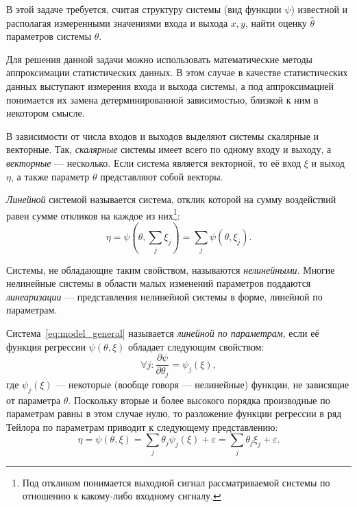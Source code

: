 В этой задаче требуется,
считая структуру системы (вид функции \( \psi \)) известной и располагая
измеренными значениями входа и выхода \( x, y \),
найти оценку \( \hat{\theta} \) параметров системы \( \theta \).

Для решения данной задачи можно использовать математические методы аппроксимации статистических данных.
В этом случае в качестве статистических данных выступают измерения входа и выхода системы,
а под аппроксимацией понимается их замена детерминированной зависимостью,
близкой к ним в некотором смысле. %

В зависимости от числа входов и выходов выделяют системы скалярные и векторные.
Так, \emph{скалярные} системы имеет всего по одному входу и выходу, а \emph{векторные} --- несколько.
Если система является векторной, то её вход \( \xi \) и выход \( \eta \),
а также параметр \( \theta \) представляют собой векторы.

\emph{Линейной} системой называется система,
отклик которой на сумму воздействий равен сумме откликов на каждое из них\footnote{%
  Под откликом понимается выходной сигнал рассматриваемой системы по отношению к
  какому-либо входному сигналу.}:
\begin{equation*}
  \eta = \psi(\theta, \sum_j \xi_j) = \sum_j \psi(\theta, \xi_j).
\end{equation*}

Системы, не обладающие таким свойством, называются \emph{нелинейными}.
Многие нелинейные системы в области малых изменений параметров поддаются
\emph{линеаризации} --- представления нелинейной системы в форме, линейной по параметрам.

Система~\eqref{eq:model_general} называется \emph{линейной по параметрам},
если её функция регрессии \( \psi(\theta, \xi) \) обладает следующим свойством:
\begin{equation*}
  \forall j: \dfrac{\partial \psi}{\partial \theta_j} = \psi_j(\xi),
\end{equation*}
где \( \psi_j(\xi) \) --- некоторые (вообще говоря --- нелинейные) функции,
не зависящие от параметра \( \theta \).
Поскольку вторые и более высокого порядка производные по параметрам равны в этом случае нулю,
то разложение функции регрессии в ряд Тейлора по параметрам приводит к следующему представлению:
\begin{equation}
  \eta =
  \psi(\theta, \xi) =
  \sum_j \theta_j \psi_j(\xi) + \varepsilon =
  \sum_j \theta_j \xi_j + \varepsilon.
  \label{eq:linearization}
\end{equation}

